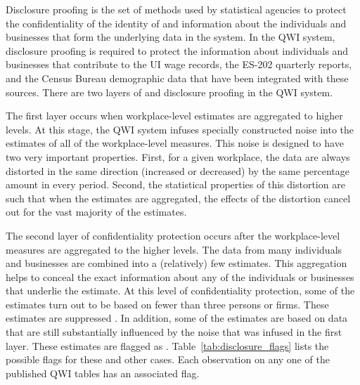                       


%
%

\label{cha:disclosure_proofing}

Disclosure proofing is the set of methods used by statistical agencies to
protect the confidentiality of the identity of and information about the
individuals and businesses that form the underlying data in the system. In
the QWI system, disclosure proofing is required to protect the information
about individuals and businesses that contribute to the UI wage
records, the ES-202 quarterly reports, and the Census Bureau demographic
data that have been integrated with these sources. There are two layers of %
 and disclosure proofing in the QWI
system.

The first layer occurs when workplace-level estimates are aggregated to
higher levels. At this stage, the QWI
system infuses specially constructed noise into the estimates of all of the
workplace-level measures. This noise is designed to have two very
important properties. First, for a given workplace, the data are always
distorted in the same direction (increased or decreased) by the same
percentage amount in every period. Second, the statistical properties%
 of this distortion are such that
when the estimates are aggregated, the effects of the distortion cancel out for the vast
majority of the estimates.

The second layer of confidentiality protection occurs after the
workplace-level measures are aggregated to the higher levels. The data from many individuals and businesses are combined
into a (relatively) few estimates. This aggregation helps to conceal the
exact information about any of the individuals or businesses that underlie
the estimate. At this level of confidentiality protection, some of the
estimates turn out to be based on fewer than three persons or firms. These estimates
are suppressed%
. In addition, some of the estimates are based on data
that are still substantially influenced by the noise that was infused in the
first layer. These estimates are flagged as . Table~\ref{tab:disclosure_flags} lists the possible flags for
these and other cases. Each observation on any one of the published QWI tables has an
associated flag. 

